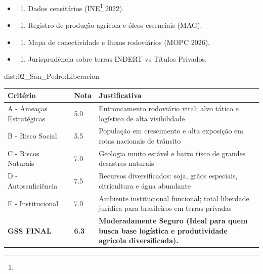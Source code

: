 {\begin{itemize}
\tightlist
\item
  \begin{enumerate}
  \def\labelenumi{\arabic{enumi})}
  \tightlist
  \item
    Dados censitários (INE\footnote{\fineINE} 2022).
  \end{enumerate}
\item
  \begin{enumerate}
  \def\labelenumi{\arabic{enumi})}
  \setcounter{enumi}{1}
  \tightlist
  \item
    Registro de produção agrícola e óleos essenciais (MAG).
  \end{enumerate}
\item
  \begin{enumerate}
  \def\labelenumi{\arabic{enumi})}
  \setcounter{enumi}{2}
  \tightlist
  \item
    Mapa de conectividade e fluxos rodoviários (MOPC 2026).
  \end{enumerate}
\item
  \begin{enumerate}
  \def\labelenumi{\arabic{enumi})}
  \setcounter{enumi}{3}
  \tightlist
  \item
    Jurisprudência sobre terras INDERT vs Títulos Privados.
  \end{enumerate}
\end{itemize}}{dist:02_San_Pedro:Liberacion}
\begin{table}[ht!]
\small \begin{tabular}{p{3.0cm}p{0.8cm}p{6.0cm}} \toprule
\textbf{Critério} & \textbf{Nota} & \textbf{Justificativa} \\ \midrule
A - Ameaças Estratégicas & 5.0 & Entroncamento rodoviário vital; alvo tático e logístico de alta visibilidade \\
B - Risco Social & 5.5 & População em crescimento e alta exposição em rotas nacionais de trânsito \\
C - Riscos Naturais & 7.0 & Geologia muito estável e baixo risco de grandes desastres naturais \\
D - Autossuficiência & 7.5 & Recursos diversificados: soja, grãos especiais, citricultura e água abundante \\
E - Institucional & 7.0 & Ambiente institucional funcional; total liberdade jurídica para brasileiros em terras privadas \\
\midrule \textbf{GSS FINAL} & \textbf{6.3} & \textbf{Moderadamente Seguro (Ideal para quem busca base logística e produtividade agrícola diversificada).} \\ \bottomrule \end{tabular}
\end{table}
